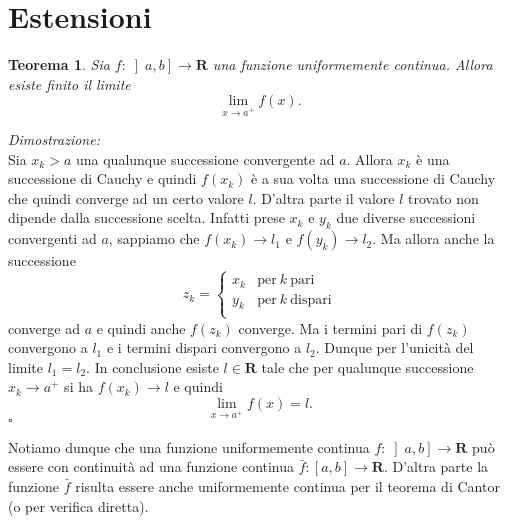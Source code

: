 \documentclass[italian,a4paper]{article}
\newcommand{\R}{\mathbf{R}}
\newtheorem{theorem}{Teorema}
\newenvironment{proof}
        {%
                {}%
                {%
                }%
        \noindent%
        {\it Dimostrazione:}\\%
        }%
        {%
        \hfill$\square$%
        }
\begin{document}
\section{Estensioni}
\begin{theorem}
Sia $f\colon \left]a,b\right]\to \R$ una funzione uniformemente continua.
Allora esiste finito il limite
\[
	\lim_{x\to a^+} f(x).
\]
\end{theorem}
\begin{proof}
Sia $x_k> a$ una qualunque successione convergente ad $a$.
Allora $x_k$ \`e una successione di Cauchy e quindi $f(x_k)$ \`e a sua
volta una successione di Cauchy che quindi converge ad un certo valore
$l$. D'altra parte il valore $l$ trovato non dipende dalla successione
scelta.
Infatti prese 
$x_k$ e $y_k$ due diverse successioni convergenti ad $a$, 
sappiamo che $f(x_k)\to l_1$ e $f(y_k)\to l_2$.
Ma allora anche la successione
\[
	z_k= \left\{\begin{array}{ll}
		x_k & \mathrm{per}\ k\ \mathrm{pari}\\
		y_k & \mathrm{per}\ k\ \mathrm{dispari}\\
		    \end{array}\right.
\]
converge ad $a$ e quindi anche $f(z_k)$ converge.
Ma i termini pari di $f(z_k)$ convergono a $l_1$ e i termini dispari
convergono a $l_2$. Dunque per l'unicit\`a del limite $l_1=l_2$.
In conclusione esiste $l\in\R$ tale che per qualunque successione
$x_k\to a^+$ si ha $f(x_k)\to l$ e quindi 
\[
	\lim_{x\to a^+} f(x)=l.
\]
\end{proof}

Notiamo dunque che una funzione uniformemente continua $f\colon
\left]a,b\right]\to \R$ pu\`o essere con continuit\`a ad una funzione
continua $\bar f\colon [a,b]\to\R$. D'altra parte la funzione $\bar f$
risulta essere anche uniformemente continua per il teorema di Cantor
(o per verifica diretta).


\end{document}
